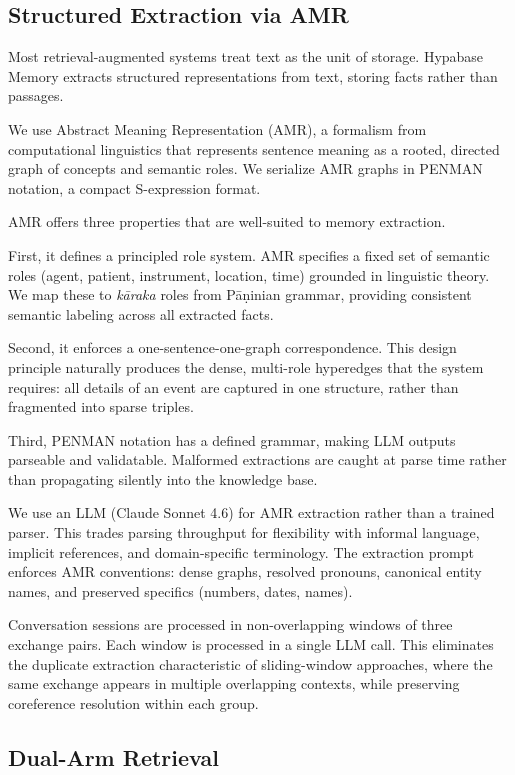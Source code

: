 \documentclass[11pt,a4paper]{article}
\begin{document}
\subsection{Structured Extraction via AMR}

Most retrieval-augmented systems treat text as the unit of storage. Hypabase Memory extracts structured representations from text, storing facts rather than passages.

We use Abstract Meaning Representation (AMR), a formalism from computational linguistics \citep{banarescu2013amr} that represents sentence meaning as a rooted, directed graph of concepts and semantic roles. We serialize AMR graphs in PENMAN notation, a compact S-expression format.

AMR offers three properties that are well-suited to memory extraction.

First, it defines a principled role system. AMR specifies a fixed set of semantic roles (agent, patient, instrument, location, time) grounded in linguistic theory. We map these to \textit{k\=araka} roles from P\=a\d{n}inian grammar, providing consistent semantic labeling across all extracted facts.

Second, it enforces a one-sentence-one-graph correspondence. This design principle naturally produces the dense, multi-role hyperedges that the system requires: all details of an event are captured in one structure, rather than fragmented into sparse triples.

Third, PENMAN notation has a defined grammar, making LLM outputs parseable and validatable. Malformed extractions are caught at parse time rather than propagating silently into the knowledge base.

We use an LLM (Claude Sonnet 4.6) for AMR extraction rather than a trained parser. This trades parsing throughput for flexibility with informal language, implicit references, and domain-specific terminology. The extraction prompt enforces AMR conventions: dense graphs, resolved pronouns, canonical entity names, and preserved specifics (numbers, dates, names).

Conversation sessions are processed in non-overlapping windows of three exchange pairs. Each window is processed in a single LLM call. This eliminates the duplicate extraction characteristic of sliding-window approaches, where the same exchange appears in multiple overlapping contexts, while preserving coreference resolution within each group.

\subsection{Dual-Arm Retrieval}
\end{document}

